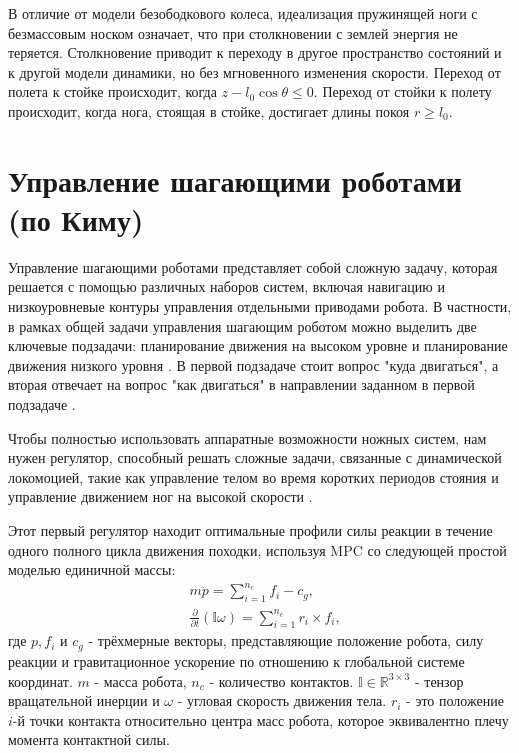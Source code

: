 В отличие от модели безободкового колеса, идеализация пружинящей ноги с безмассовым носком означает, что при столкновении с землей энергия не теряется. Столкновение приводит к переходу в другое пространство состояний и к другой модели динамики, но без мгновенного изменения скорости. Переход от полета к стойке происходит, когда $z -
l_0\cos\theta \le 0.$  Переход от стойки к полету происходит, когда нога, стоящая в стойке, достигает длины покоя $r \ge l_0$.
\section{Управление шагающими роботами (по Киму)}\label{sec:ch2/sect6}
Управление шагающими роботами представляет собой сложную задачу, которая решается с помощью различных наборов систем, включая навигацию и низкоуровневые контуры управления отдельными приводами робота. В частности, в рамках общей задачи управления шагающим роботом можно выделить две ключевые подзадачи: планирование движения на высоком уровне и планирование движения низкого уровня \cite{WalkingRobots}. В первой подзадаче стоит вопрос "куда двигаться", а вторая отвечает на вопрос "как двигаться"  в направлении заданном в первой подзадаче \cite{bib1}.

Чтобы полностью использовать аппаратные возможности ножных систем, нам нужен регулятор, способный решать сложные задачи, связанные с динамической локомоцией, такие как управление телом во время коротких периодов стояния и управление движением ног на высокой скорости \cite{KIM2019}.

Этот первый регулятор находит оптимальные профили силы реакции в течение одного полного цикла движения походки, используя MPC со следующей простой моделью единичной массы:
\begin{align}
	& m \ddot{p} = \sum_{i=1}^{n_c}f_i-c_g,\\
	& \frac{\partial}{\partial t}(\mathbb{I} \omega) = \sum_{i=1}^{n_c} r_i \times f_i,
\end{align}
где $p, f_i$ и $c_g$ - трёхмерные векторы, представляющие положение робота, силу реакции и гравитационное ускорение по отношению к глобальной системе координат. $m$ - масса робота, $n_c$ - количество контактов. $\mathbb{I} \in \mathbb{R}^{3\times 3}$ - тензор вращательной инерции и $\omega$ - угловая скорость движения тела. $r_i$ - это положение $i$-й точки контакта относительно центра масс робота, которое эквивалентно плечу момента контактной силы.

